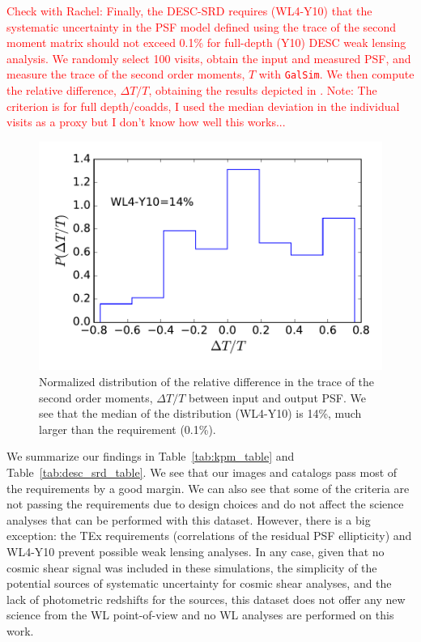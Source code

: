 \documentclass[twocolumn]{aastex62}
\begin{document}
\textcolor{red}{Check with Rachel: Finally, the DESC-SRD requires (WL4-Y10) that the systematic uncertainty in the PSF model defined using the trace of the second moment matrix should not exceed 0.1\% for full-depth (Y10) DESC weak lensing analysis. We randomly select 100 visits, obtain the input and measured PSF, and measure the trace of the second order moments, $T$ with \texttt{GalSim}. We then compute the relative difference, $\Delta T/T$, obtaining the results depicted in . Note: The criterion is for full depth/coadds, I used the median deviation in the individual visits as a proxy but I don't know how well this works...}

\begin{figure}
\centering
\includegraphics[width=0.9\columnwidth]{WL4-Y10}
\caption{Normalized distribution of the relative difference in the trace of the second order moments, $\Delta T/T$ between input and output PSF. We see that the median of the distribution (WL4-Y10) is 14\%, much larger than the requirement (0.1\%).}
\label{fig:WL4-Y10}
\end{figure}

We summarize our findings in Table~\ref{tab:kpm_table} and Table~\ref{tab:desc_srd_table}. We see that our images and catalogs pass most of the requirements by a good margin. We can also see that some of the criteria are not passing the requirements due to design choices and do not affect the science analyses that can be performed with this dataset. However, there is a big exception: the TEx requirements (correlations of the residual PSF ellipticity) and WL4-Y10 prevent possible weak lensing analyses. In any case, given that no cosmic shear signal was included in these simulations, the simplicity of the potential sources of systematic uncertainty for cosmic shear analyses, and the lack of photometric redshifts for the sources, this dataset does not offer any new science from the WL point-of-view and no WL analyses are performed on this work. 
\end{document}

